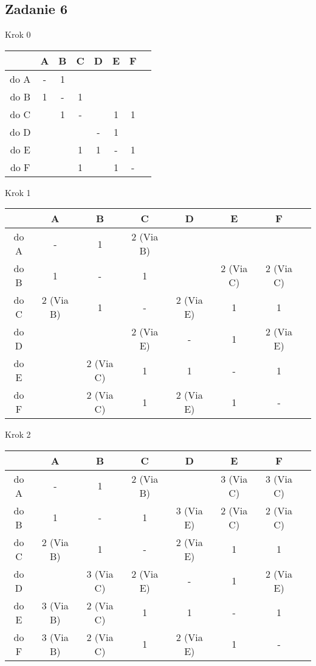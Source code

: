 \documentclass[a4paper]{article}
\begin{document}
\subsection*{Zadanie 6}
\begin{center}
Krok 0\\
\begin{tabular}{|c *{6}{|c} |c|}\hline
 & A & B & C & D & E & F\\
\hline 
do A & - & 1 & & & &\\
\hline 
do B & 1 & - & 1 & & &\\
\hline 
do C & & 1 & - & & 1 & 1\\
\hline 
do D & & & & - & 1 &\\
\hline 
do E & & & 1 & 1 & - & 1\\
\hline
do F & & & 1 & & 1 & -\\
\hline
\end{tabular}

Krok 1\\
\begin{tabular}{|c *{6}{|c} |c|}\hline
 	 & A & B & C 		 & D & E & F\\
\hline 
do A & - & 1 & 2 (Via B) & & &\\
\hline 
do B & 1 & - & 1 		 & & 2 (Via C) & 2 (Via C)\\
\hline 
do C & 2 (Via B) & 1 & - & 2 (Via E) & 1 & 1\\
\hline 
do D & & & 2 (Via E) & - & 1 & 2 (Via E)\\
\hline 
do E & & 2 (Via C) & 1 & 1 & - & 1\\
\hline
do F & & 2 (Via C) & 1 & 2 (Via E) & 1 & -\\
\hline
\end{tabular}

Krok 2\\
\begin{tabular}{|c *{6}{|c} |c|}\hline
 & A & B & C & D & E & F\\
\hline 
do A & - & 1 & 2 (Via B) &  & 3 (Via C) &  3 (Via C)\\
\hline 
do B & 1 & - & 1 & 3 (Via E) & 2 (Via C) & 2 (Via C)\\
\hline 
do C & 2 (Via B) & 1 & - & 2 (Via E) & 1 & 1\\
\hline 
do D & 			 & 3 (Via C) & 2 (Via E) & - & 1 & 2 (Via E)\\
\hline 
do E & 3 (Via B) & 2 (Via C) & 1 & 1 & - & 1\\
\hline
do F & 3 (Via B) & 2 (Via C) & 1 & 2 (Via E) & 1 & -\\
\hline
\end{tabular}


\end{center}
\end{document}
